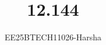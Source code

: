 \documentclass[journal]{IEEEtran}
\begin{document}

\vspace{3cm}

\title{12.144}
\author{EE25BTECH11026-Harsha}
 \maketitle
{\let\newpage\relax\maketitle}

\renewcommand{\thefigure}{\theenumi}
\renewcommand{\thetable}{\theenumi}
\setlength{\intextsep}{10pt} %


\renewcommand{\thetable}{\theenumi}
\end{document}
